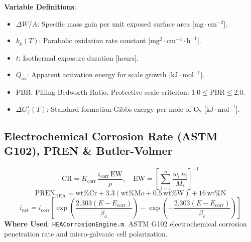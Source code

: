\documentclass[11pt,a4paper]{article}
\begin{document}
\noindent\textbf{Variable Definitions}:
\begin{itemize}
  \item $\Delta W / A$: Specific mass gain per unit exposed surface area [$\text{mg}\cdot\text{cm}^{-2}$].
  \item $k_p(T)$: Parabolic oxidation rate constant [$\text{mg}^2\cdot\text{cm}^{-4}\cdot\text{h}^{-1}$].
  \item $t$: Isothermal exposure duration [$\text{hours}$].
  \item $Q_{\text{ox}}$: Apparent activation energy for scale growth [$\text{kJ}\cdot\text{mol}^{-1}$].
  \item $\text{PBR}$: Pilling-Bedworth Ratio. Protective scale criterion: $1.0 \le \text{PBR} \le 2.0$.
  \item $\Delta G_f^\circ(T)$: Standard formation Gibbs energy per mole of $\text{O}_2$ [$\text{kJ}\cdot\text{mol}^{-1}$].
\end{itemize}

\subsection{Electrochemical Corrosion Rate (ASTM G102), PREN \& Butler-Volmer}
\begin{equation}
\text{CR} = K_{\text{corr}} \, \frac{i_{\text{corr}} \, \text{EW}}{\rho}, \quad \text{EW} = \left[ \sum_{i=1}^n \frac{w_i \, n_i}{M_i} \right]^{-1}
\end{equation}
\begin{equation}
\text{PREN}_{\text{HEA}} = \text{wt}\%\text{Cr} + 3.3 \left(\text{wt}\%\text{Mo} + 0.5\,\text{wt}\%\text{W}\right) + 16\,\text{wt}\%\text{N}
\end{equation}
\begin{equation}
i_{\text{net}} = i_{\text{corr}} \left[ \exp\left(\frac{2.303(E - E_{\text{corr}})}{\beta_a}\right) - \exp\left(-\frac{2.303(E - E_{\text{corr}})}{\beta_c}\right) \right]
\end{equation}
\textbf{Where Used}: \texttt{HEACorrosionEngine.m}. ASTM G102 electrochemical corrosion penetration rate and micro-galvanic cell polarization.
\end{document}
